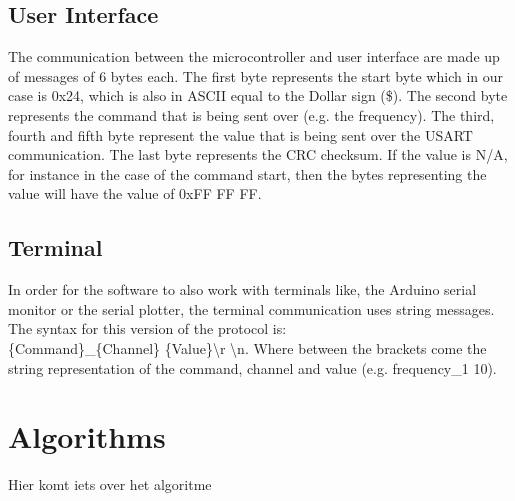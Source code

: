 \documentclass[conference]{IEEEtran}
\begin{document}
\subsection{User Interface}\label{UI_communication}
The communication between the microcontroller and user interface are made up of messages of 6 bytes each. The first byte represents the start byte which in our case is 0x24, which is also in ASCII equal to the Dollar sign (\$). The second byte represents the command that is being sent over (e.g. the frequency). The third, fourth and fifth byte represent the value that is being sent over the USART communication. The last byte represents the CRC checksum. If the value is N/A, for instance in the case of the command start, then the bytes representing the value will have the value of 0xFF FF FF.

\subsection{Terminal}
In order for the software to also work with terminals like, the Arduino serial monitor or the serial plotter, the terminal communication uses string messages. The syntax for this version of the protocol is:
\\ \{Command\}\_\{Channel\} \{Value\}\textbackslash r \textbackslash n. Where between the brackets come the string representation of the command, channel and value (e.g. frequency\_1 10).

\section{Algorithms}
Hier komt iets over het algoritme




\end{document}
